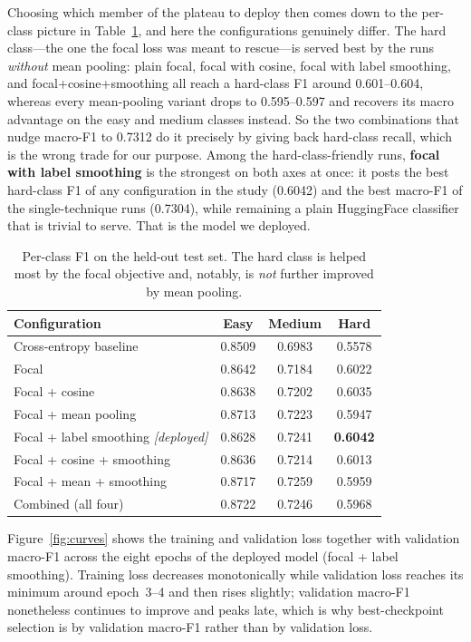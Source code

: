 \documentclass[12pt,a4paper]{report}
\begin{document}
Choosing which member of the plateau to deploy then comes down to the per-class
picture in Table~\ref{tab:perclass}, and here the configurations genuinely
differ. The hard class---the one the focal loss was meant to rescue---is served
best by the runs \emph{without} mean pooling: plain focal, focal with cosine,
focal with label smoothing, and focal+cosine+smoothing all reach a hard-class F1
around 0.601--0.604, whereas every mean-pooling variant drops to 0.595--0.597 and
recovers its macro advantage on the easy and medium classes instead. So the two
combinations that nudge macro-F1 to 0.7312 do it precisely by giving back
hard-class recall, which is the wrong trade for our purpose. Among the
hard-class-friendly runs, \textbf{focal with label smoothing} is the strongest on
both axes at once: it posts the best hard-class F1 of any configuration in the
study (0.6042) and the best macro-F1 of the single-technique runs (0.7304),
while remaining a plain HuggingFace classifier that is trivial to serve. That is
the model we deployed.

\begin{table}[ht]
\centering
\caption{Per-class F1 on the held-out test set. The hard class is helped most by
the focal objective and, notably, is \emph{not} further improved by mean pooling.}
\label{tab:perclass}
\begin{tabular}{lccc}
\toprule
\textbf{Configuration} & \textbf{Easy} & \textbf{Medium} & \textbf{Hard} \\
\midrule
Cross-entropy baseline           & 0.8509 & 0.6983 & 0.5578 \\
Focal                            & 0.8642 & 0.7184 & 0.6022 \\
Focal + cosine                   & 0.8638 & 0.7202 & 0.6035 \\
Focal + mean pooling             & 0.8713 & 0.7223 & 0.5947 \\
Focal + label smoothing \emph{[deployed]} & 0.8628 & 0.7241 & \textbf{0.6042} \\
Focal + cosine + smoothing       & 0.8636 & 0.7214 & 0.6013 \\
Focal + mean + smoothing     & 0.8717 & 0.7259 & 0.5959 \\
Combined (all four)          & 0.8722 & 0.7246 & 0.5968 \\
\bottomrule
\end{tabular}
\end{table}

Figure~\ref{fig:curves} shows the training and validation loss together with
validation macro-F1 across the eight epochs of the deployed model (focal + label smoothing). Training
loss decreases monotonically while validation loss reaches its minimum around
epoch~3--4 and then rises slightly; validation macro-F1 nonetheless continues to
improve and peaks late, which is why best-checkpoint selection is by validation
macro-F1 rather than by validation loss.
\end{document}
